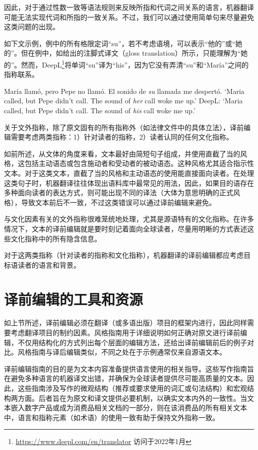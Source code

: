 \documentclass[output=paper,colorlinks,citecolor=brown]{langscibook}
\begin{document}
因此，对于通过性数一致等语法规则来反映所指和代词之间关系的语言，机器翻译可能无法实现代词和所指的一致关系。不过，我们可以通过使用简单句来尽量避免这类问题的出现。

如下文示例，例中的所有格限定词“su”，若不考虑语境，可以表示“他的”或“她的”。但在例中，如给出的注脚式译文（gloss translation）所示，只能理解为“她的”。然而，DeepL\footnote{\url{https://www.deepl.com/en/translator} 访问于2022年1月}将单词“su”译为“his”，因为它没有弄清“su”和“María”之间的指称联系。

\ea\label{ex:sanchez:1}
María llamó,  pero Pepe no llamó.   El sonido de \textit{su} llamada me despertó. 
\glt ‘Maria called, but  Pepe didn’t call. The sound of \textit{her} call woke me up.’
\glt DeepL: `Maria called, but Pepe didn't call. The sound of \textit{his} call woke me up.'
\z

关于文外指称，除了原文固有的所有指称外（如法律文件中的具体立法），译前编辑需要考虑两类指称：1）针对读者的指称，2）读者认同的任何文化指称。

如前所述，从文体的角度来看，文本最好由简短句子组成，并使用直截了当的风格，这包括主动语态或包含施动者和受动者的被动语态。这种风格尤其适合指示性文本。对于这类文本，直截了当的风格和主动语态的使用能直接面向读者。在处理这类句子时，机器翻译往往体现出语料库中最常见的用法，因此，如果目的语存在多种面向读者的表达方式，则可能出现不同的译法（大体为意思明确的正式风格），导致文本前后不一致，不过这类错误可以通过译前编辑来避免。

与文化因素有关的文外指称很难笼统地处理，尤其是源语特有的文化指称。在许多情况下，文本的译前编辑就是要时刻记着面向全球读者，尽量用明晰的方式表述这些文化指称中的所有隐含信息。

对于这两类指称（针对读者的指称和文化指称），机器翻译的译前编辑都应考虑目标语读者的语言和背景。


\section{译前编辑的工具和资源}\label{sec:sanchez:7}

如上节所述，译前编辑必须在翻译（或多语出版）项目的框架内进行，因此同样需要考虑翻译项目的制约因素。风格指南用于详细说明如何正确对原文进行译前编辑，不仅用结构化的方式列出每个层面的编辑方法，还给出译前编辑前后的例子对比。风格指南与译后编辑类似，不同之处在于示例通常仅来自源语文本。

译前编辑指南的目的是为文本内容准备提供语言使用的相关指导。这些写作指南旨在避免多种语言的机器译文出错，并确保为全球读者提供尽可能高质量的文本。因此，这些指南涉及写作的微观结构（推荐或要求使用的词汇或句法结构）和宏观结构两方面。后者旨在为原文和译文提供必要机制，以确实文本内外的一致性。当文本嵌入数字产品或成为消费品相关文档的一部分，则在该消费品的所有相关文本中，语言和指称元素（如术语）的使用一致有助于保持文外指称一致。
\end{document}
